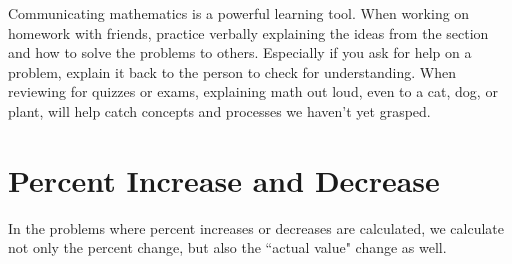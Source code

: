 \documentclass{ximera}
\begin{document}
\begin{MM}
Communicating mathematics is a powerful learning tool.  When working on homework with friends, practice verbally explaining the ideas from the section and how to solve the problems to others.  Especially if you ask for help on a problem, explain it back to the person to check for understanding. When reviewing for quizzes or exams, explaining math out loud, even to a cat, dog, or plant, will help catch concepts and processes we haven't yet grasped.  
\end{MM}

\section{Percent Increase and Decrease}



In the problems where percent increases or decreases are calculated, we calculate not only the percent change, but also the ``actual value" change as well.  
\end{document}
